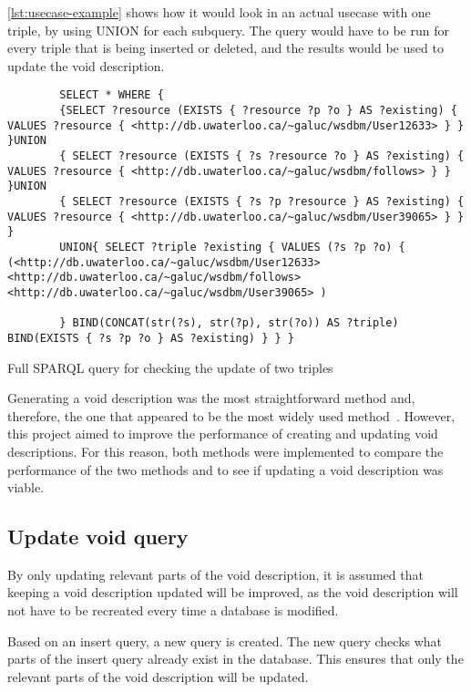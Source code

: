 \autoref{lst:usecase-example} shows how it would look in an actual usecase with one triple, by using UNION for each subquery. The query would have to be run for every triple that is being inserted or deleted, and the results would be used to update the \gls{void} description.

\begin{listing}[htb!]
    \begin{verbatim}          
        SELECT * WHERE { 
        {SELECT ?resource (EXISTS { ?resource ?p ?o } AS ?existing) { VALUES ?resource { <http://db.uwaterloo.ca/~galuc/wsdbm/User12633> } } }UNION 
        { SELECT ?resource (EXISTS { ?s ?resource ?o } AS ?existing) { VALUES ?resource { <http://db.uwaterloo.ca/~galuc/wsdbm/follows> } } }UNION 
        { SELECT ?resource (EXISTS { ?s ?p ?resource } AS ?existing) { VALUES ?resource { <http://db.uwaterloo.ca/~galuc/wsdbm/User39065> } } }
        UNION{ SELECT ?triple ?existing { VALUES (?s ?p ?o) {  (<http://db.uwaterloo.ca/~galuc/wsdbm/User12633>   <http://db.uwaterloo.ca/~galuc/wsdbm/follows>   <http://db.uwaterloo.ca/~galuc/wsdbm/User39065> )
 
        } BIND(CONCAT(str(?s), str(?p), str(?o)) AS ?triple) BIND(EXISTS { ?s ?p ?o } AS ?existing) } } } 
    \end{verbatim}
    \caption{Full SPARQL query for checking the update of two triples}
    \label{lst:usecase-example}
\end{listing}

Generating a \gls{void} description was the most straightforward method and, therefore, the one that appeared to be the most widely used method~\cite{optimize-SPARQL-queries, aether-tool}. However, this project aimed to improve the performance of creating and updating \gls{void} descriptions. For this reason, both methods were implemented to compare the performance of the two methods and to see if updating a \gls{void} description was viable.

\subsection{Update \gls{void} query}\label{sec:update-void-query}
By only updating relevant parts of the \gls{void} description, it is assumed that keeping a \gls{void} description updated will be improved, as the \gls{void} description will not have to be recreated every time a database is modified.

Based on an insert query, a new query is created. The new query checks what parts of the insert query already exist in the database. This ensures that only the relevant parts of the \gls{void} description will be updated.

